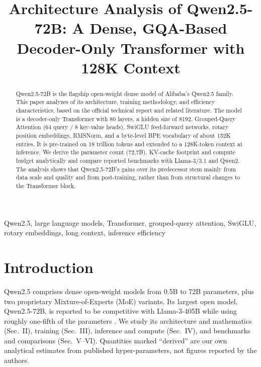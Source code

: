 \documentclass[conference]{IEEEtran}
\begin{document}
\title{Architecture Analysis of Qwen2.5-72B: A Dense, GQA-Based Decoder-Only Transformer with 128K Context}


\maketitle

\begin{abstract}
Qwen2.5-72B is the flagship open-weight dense model of Alibaba's Qwen2.5 family. This paper analyzes of its architecture, training methodology, and efficiency characteristics, based on the official technical report and related literature. The model is a decoder-only Transformer with 80 layers, a hidden size of 8192, Grouped-Query Attention (64 query / 8 key-value heads), SwiGLU feed-forward networks, rotary position embeddings, RMSNorm, and a byte-level BPE vocabulary of about 152K entries. It is pre-trained on 18 trillion tokens and extended to a 128K-token context at inference. We derive the parameter count (72.7B), KV-cache footprint and compute budget analytically and compare reported benchmarks with Llama-3/3.1 and Qwen2. The analysis shows that Qwen2.5-72B's gains over its predecessor stem mainly from data scale and quality and from post-training, rather than from structural changes to the Transformer block.
\end{abstract}

\begin{IEEEkeywords}
Qwen2.5, large language models, Transformer, grouped-query attention, SwiGLU, rotary embeddings, long context, inference efficiency
\end{IEEEkeywords}

\section{Introduction}
Qwen2.5 \cite{qwen25} comprises dense open-weight models from 0.5B to 72B parameters, plus two proprietary Mixture-of-Experts (MoE) variants. Its largest open model, Qwen2.5-72B, is reported to be competitive with Llama-3-405B while using roughly one-fifth of the parameters \cite{qwen25blog}. We study its architecture and mathematics (Sec.~II), training (Sec.~III), inference and compute (Sec.~IV), and benchmarks and comparisons (Sec.~V--VI). Quantities marked ``derived'' are our own analytical estimates from published hyper-parameters, not figures reported by the authors.
\end{document}

